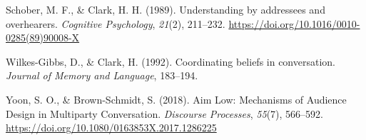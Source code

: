 \documentclass[10pt, letterpaper]{article}
\begin{document}
\begin{CSLReferences}{1}{0}
Schober, M. F., \& Clark, H. H. (1989). Understanding by addressees and
overhearers. \emph{Cognitive Psychology}, \emph{21}(2), 211--232.
\url{https://doi.org/10.1016/0010-0285(89)90008-X}

Wilkes-Gibbs, D., \& Clark, H. (1992). Coordinating beliefs in
conversation. \emph{Journal of Memory and Language}, 183--194.

Yoon, S. O., \& Brown-Schmidt, S. (2018). Aim {Low}: {Mechanisms} of
{Audience Design} in {Multiparty Conversation}. \emph{Discourse
Processes}, \emph{55}(7), 566--592.
\url{https://doi.org/10.1080/0163853X.2017.1286225}

\end{CSLReferences}


\end{document}
